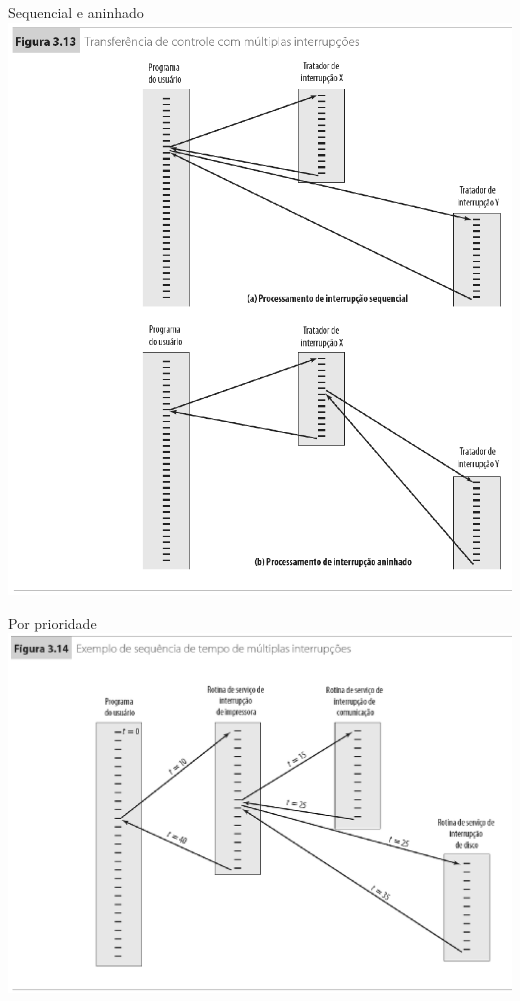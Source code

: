 \begin{slide}{Sequencial e aninhado}
   \centering
   \includegraphics[height=0.8\textheight]{figs/multi1.eps}
\end{slide}

\begin{slide}{Por prioridade}
   \centering
   \includegraphics[height=0.8\textheight]{figs/multi2.eps}
\end{slide}

